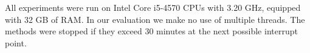 \documentclass[10pt,twocolumn,letterpaper]{article}
\theoremstyle{definition}
\begin{document}
All experiments were run on Intel Core i5-4570 CPUs
with 3.20 GHz, equipped with 32 GB of RAM.
In our evaluation we make no use of multiple threads.
The methods were stopped if they exceed 30 minutes at the next possible interrupt point.




\end{document}
